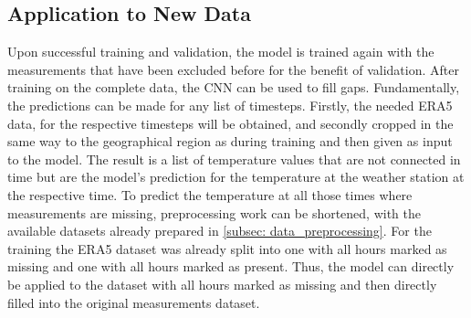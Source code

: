 \subsection{Application to New Data}
Upon successful training and validation, the model is trained again with the measurements that have been excluded before for the benefit of validation.
After training on the complete data, the CNN can be used to fill gaps.
Fundamentally, the predictions can be made for any list of timesteps. Firstly, the needed ERA5 data, for the respective timesteps will be obtained, and secondly cropped in the same way to the geographical region as during training and then given as input to the model.
The result is a list of temperature values that are not connected in time but are the model's prediction for the temperature at the weather station at the respective time.
To predict the temperature at all those times where measurements are missing, preprocessing work can be shortened, with the available datasets already prepared in \ref{subsec: data_preprocessing}.
For the training the ERA5 dataset was already split into one with all hours marked as missing and one with all hours marked as present.
Thus, the model can directly be applied to the dataset with all hours marked as missing and then directly filled into the original measurements dataset.